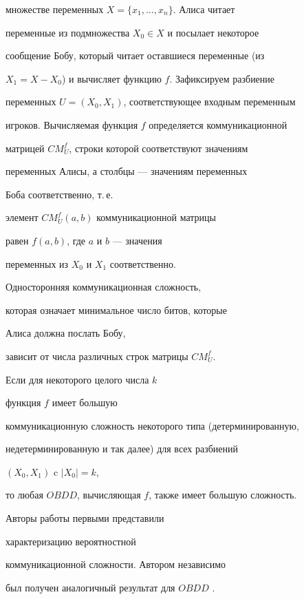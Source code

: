 множестве переменных $X=\{x_1,\dotsc,x_n\}$. Алиса читает


переменные из подмножества $X_0\in X$ и посылает некоторое


сообщение Бобу, который читает оставшиеся переменные (из


$X_1=X-X_0$) и вычисляет функцию $f$. Зафиксируем разбиение


переменных $U=(X_0,X_1)$, соответствующее входным переменным


игроков. Вычисляемая функция $f$ определяется коммуникационной


матрицей $CM_U^f$, строки которой соответствуют значениям


переменных Алисы, а столбцы --- значениям переменных


Боба соответственно, т.\,е.


элемент $CM_U^f(a,b)$ коммуникационной матрицы


равен $f(a,b)$, где $a$ и $b$ --- значения


переменных из $X_0$ и $X_1$ соответственно.


Односторонняя коммуникационная сложность,


которая означает минимальное число битов, которые


Алиса должна послать Бобу,


зависит от числа различных строк матрицы $CM_U^f$.


Если для некоторого целого числа $k$


функция $f$ имеет большую     %


коммуникационную сложность некоторого типа (детерминированную,


недетерминированную и так далее) для всех разбиений


$(X_0,X_1)$ c $|X_0|=k$,


то любая $OBDD$, вычисляющая $f$, также имеет большую сложность.





Авторы работы \cite{PS86} первыми представили


характеризацию вероятностной


коммуникационной сложности. Автором независимо


был получен аналогичный результат для $OBDD$ \cite{M01}.








